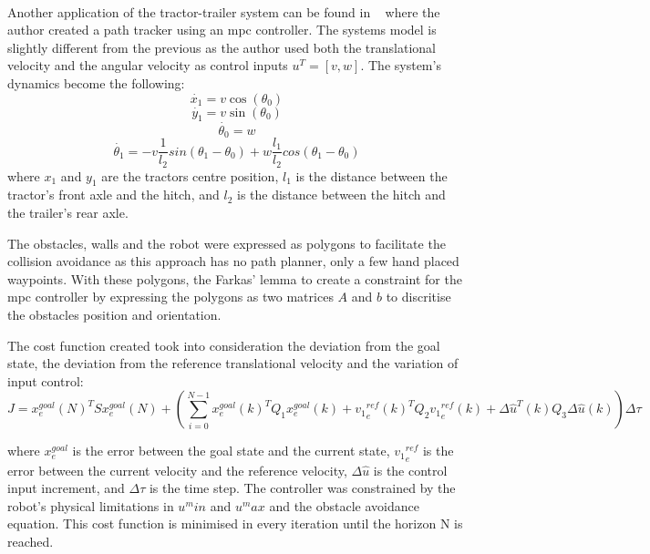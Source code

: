 \paragraph{}Another application of the tractor-trailer system can be found in ~\cite{mpconly}
where the author created a path tracker using an mpc controller. The systems model is slightly different 
from the previous as the author used both the translational velocity and the angular velocity as control 
inputs $u^T=[v, w]$. The system's dynamics become the following:
\begin{equation}
    \dot{x_1} = v \cos(\theta_0)
\end{equation}
\begin{equation}
    \dot{y_1} = v \sin(\theta_0)
\end{equation}
\begin{equation}
    \dot{\theta_0} = w
\end{equation}
\begin{equation}
    \dot{\theta_1} = -v\frac{1}{l_2}sin(\theta_1-\theta_0)  + w\frac{l_1}{l_2}cos(\theta_1-\theta_0)
\end{equation}
where $x_1$ and $y_1$ are the tractors centre position, $l_1$ is the distance between the tractor's front axle and the hitch, 
and $l_2$ is the distance between the hitch and the trailer's rear axle.

The obstacles, walls and the robot were expressed as polygons to facilitate the collision avoidance as 
this approach has no path planner, only a few hand placed waypoints. With these polygons, the 
Farkas' lemma to create a constraint for the mpc controller by expressing the polygons as two matrices
$A$ and $b$ to discritise the obstacles position and orientation.

The cost function created took into consideration the deviation from the goal state, the deviation 
from the reference translational velocity and the variation of input control:
\begin{equation}
    J = x_e^{goal}(N)^TSx_e^{goal}(N) + (\sum_{i=0}^{N-1}  x_e^{goal}(k)^T Q_1 x_e^{goal}(k) + {v_1}_e^{ref}(k)^T Q_2 {v_1}_e^{ref}(k) + \Delta \hat{u}^T(k)Q_3\Delta\hat{u}(k)) \Delta \tau
\end{equation}

where $x_e^{goal}$ is the error between the goal state and the current state, ${v_1}_e^{ref}$ is the error between the current velocity and the 
reference velocity, $\Delta \hat{u}$ is the control input increment, and $\Delta \tau$ is the time step. 
The controller was constrained by the robot's physical limitations in $u^min$ and $u^max$ and the obstacle avoidance equation. 
This cost function is minimised in every iteration until the horizon N is reached.

